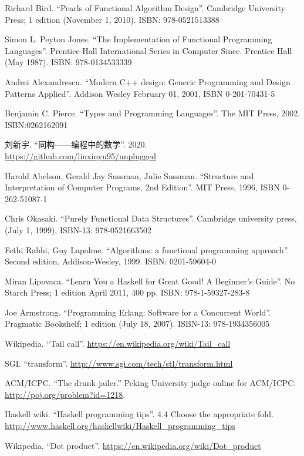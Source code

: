 \documentclass[b5paper]{ctexart}
\begin{document}
\ifx\wholebook\relax \else
\begin{thebibliography}{99}

Richard Bird. ``Pearls of Functional Algorithm Design''. Cambridge University Press; 1 edition (November 1, 2010). ISBN: 978-0521513388

Simon L. Peyton Jones. ``The Implementation of Functional Programming Languages''. Prentice-Hall International Series in Computer Since. Prentice Hall (May 1987). ISBN: 978-0134533339

Andrei Alexandrescu. ``Modern C++ design: Generic Programming and Design Patterns Applied''. Addison Wesley February 01, 2001, ISBN 0-201-70431-5

Benjamin C. Pierce. ``Types and Programming Languages''. The MIT Press, 2002. ISBN:0262162091

刘新宇. ``同构——编程中的数学''. 2020. \url{https://github.com/liuxinyu95/unplugged}

Harold Abelson, Gerald Jay Sussman, Julie Sussman. ``Structure and Interpretation of Computer Programs, 2nd Edition''. MIT Press, 1996, ISBN 0-262-51087-1

Chris Okasaki. ``Purely Functional Data Structures''. Cambridge university press, (July 1, 1999), ISBN-13: 978-0521663502

Fethi Rabhi, Guy Lapalme. ``Algorithms: a functional programming approach''. Second edition. Addison-Wesley, 1999. ISBN: 0201-59604-0

Miran Lipovaca. ``Learn You a Haskell for Great Good! A Beginner's Guide''. No Starch Press; 1 edition April 2011, 400 pp. ISBN: 978-1-59327-283-8

Joe Armstrong. ``Programming Erlang: Software for a Concurrent World''. Pragmatic Bookshelf; 1 edition (July 18, 2007). ISBN-13: 978-1934356005

Wikipedia. ``Tail call''. \url{https://en.wikipedia.org/wiki/Tail_call}

SGI. ``transform''. \url{http://www.sgi.com/tech/stl/transform.html}

ACM/ICPC. ``The drunk jailer.'' Peking University judge online for ACM/ICPC. \url{http://poj.org/problem?id=1218}.

Haskell wiki. ``Haskell programming tips''. 4.4 Choose the appropriate fold. \url{http://www.haskell.org/haskellwiki/Haskell_programming_tips}

Wikipedia. ``Dot product''. \url{https://en.wikipedia.org/wiki/Dot_product}

\end{thebibliography}

\expandafter\enddocument
\fi
\end{document}
